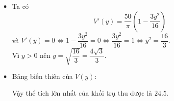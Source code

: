 \begin{ex}
{\begin{itemize}
		\item Ta có	$$V'(y) = \frac{50}{\pi}\left(1 - \frac{3y^2}{16}\right)$$
		và  $V'(y) = 0\Leftrightarrow 1 - \dfrac{3y^2}{16} = 0\Leftrightarrow \dfrac{3y^2}{16} = 1\Leftrightarrow y^2 = \dfrac{16}{3}$.\\
		Vì $y > 0$ nên $y = \sqrt{\dfrac{16}{3}} = \dfrac{4\sqrt{3}}{3}$.
		\item Bảng biến thiên của $V(y)$:
		\begin{center}
		\end{center}
		Vậy thể tích lớn nhất của khối trụ thu được là $24.5$.
	\end{itemize}
	}
\end{ex}

%

